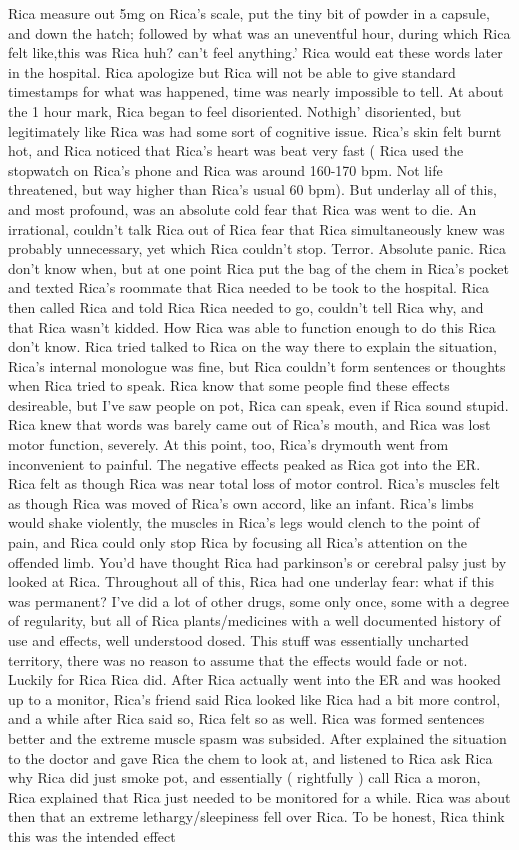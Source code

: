 \documentclass[12pt]{book}
\begin{document}
Rica measure out 5mg on Rica's scale, put the tiny bit of powder in a capsule, and down the hatch; followed by what was an uneventful hour, during which Rica felt like,this was Rica huh? can't feel anything.' Rica would eat these words later in the hospital. Rica apologize but Rica will not be able to give standard timestamps for what was happened, time was nearly impossible to tell. At about the 1 hour mark, Rica began to feel disoriented. Nothigh' disoriented, but legitimately like Rica was had some sort of cognitive issue. Rica's skin felt burnt hot, and Rica noticed that Rica's heart was beat very fast ( Rica used the stopwatch on Rica's phone and Rica was around 160-170 bpm. Not life threatened, but way higher than Rica's usual 60 bpm). But underlay all of this, and most profound, was an absolute cold fear that Rica was went to die. An irrational, couldn't talk Rica out of Rica fear that Rica simultaneously knew was probably unnecessary, yet which Rica couldn't stop. Terror. Absolute panic. Rica don't know when, but at one point Rica put the bag of the chem in Rica's pocket and texted Rica's roommate that Rica needed to be took to the hospital. Rica then called Rica and told Rica Rica needed to go, couldn't tell Rica why, and that Rica wasn't kidded. How Rica was able to function enough to do this Rica don't know. Rica tried talked to Rica on the way there to explain the situation, Rica's internal monologue was fine, but Rica couldn't form sentences or thoughts when Rica tried to speak. Rica know that some people find these effects desireable, but I've saw people on pot, Rica can speak, even if Rica sound stupid. Rica knew that words was barely came out of Rica's mouth, and Rica was lost motor function, severely. At this point, too, Rica's drymouth went from inconvenient to painful. The negative effects peaked as Rica got into the ER. Rica felt as though Rica was near total loss of motor control. Rica's muscles felt as though Rica was moved of Rica's own accord, like an infant. Rica's limbs would shake violently, the muscles in Rica's legs would clench to the point of pain, and Rica could only stop Rica by focusing all Rica's attention on the offended limb. You'd have thought Rica had parkinson's or cerebral palsy just by looked at Rica. Throughout all of this, Rica had one underlay fear: what if this was permanent? I've did a lot of other drugs, some only once, some with a degree of regularity, but all of Rica plants/medicines with a well documented history of use and effects, well understood dosed. This stuff was essentially uncharted territory, there was no reason to assume that the effects would fade or not. Luckily for Rica Rica did. After Rica actually went into the ER and was hooked up to a monitor, Rica's friend said Rica looked like Rica had a bit more control, and a while after Rica said so, Rica felt so as well. Rica was formed sentences better and the extreme muscle spasm was subsided. After explained the situation to the doctor and gave Rica the chem to look at, and listened to Rica ask Rica why Rica did just smoke pot, and essentially ( rightfully ) call Rica a moron, Rica explained that Rica just needed to be monitored for a while. Rica was about then that an extreme lethargy/sleepiness fell over Rica. To be honest, Rica think this was the intended effect 
\end{document}
